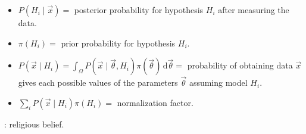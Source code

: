 \begin{itemize}
	\item $P(H_{i} \mid \vec{x}) = $ posterior probability for hypothesis $H_{i}$ after measuring the data.
	\item $\pi(H_{i}) = $ prior probability for hypothesis $H_{i}$.
	\item $P(\vec{x} \mid H_{i}) = \int_{\Omega} {P( \vec{x} \mid \vec{\theta}, H_{i} ) \pi(\vec{\theta})} \,\mathrm{d}\vec{\theta} = $ probability of obtaining data $\vec{x}$ gives each possible values of the parameters $\vec{\theta}$ assuming model $H_{i}$.
	\item $\sum_{i}{P(\vec{x} \mid H_{i}) \pi(H_{i})} = $ normalization factor.
\end{itemize}

: religious belief.
